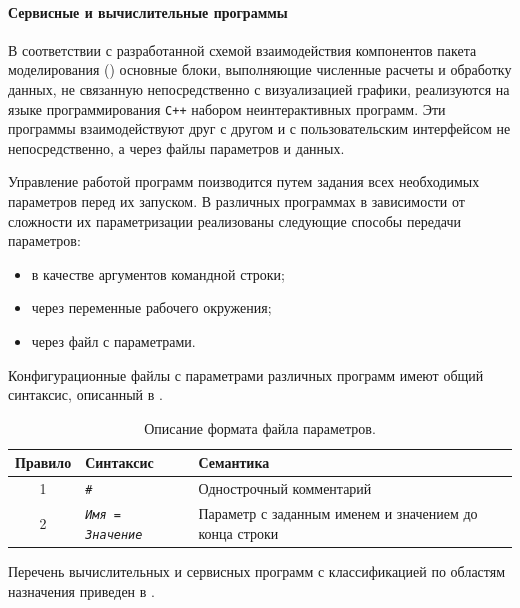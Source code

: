 \paragraph{Сервисные и вычислительные программы}

В соответствии с разработанной схемой взаимодействия компонентов
пакета моделирования () основные
блоки, выполняющие численные расчеты и обработку данных, не связанную
непосредственно с визуализацией графики, реализуются на языке
программирования {\tt C++} набором неинтерактивных программ.  Эти
программы взаимодействуют друг с другом и с пользовательским
интерфейсом не непосредственно, а через файлы параметров и данных.

Управление работой программ поизводится путем задания всех необходимых
параметров перед их запуском.  В различных программах в зависимости от
сложности их параметризации реализованы следующие способы передачи
параметров:
\begin{itemize}
\item в качестве аргументов командной строки;
\item через переменные рабочего окружения;
\item через файл с параметрами.
\end{itemize}

Конфигурационные файлы с параметрами различных программ имеют общий
синтаксис, описанный в .

\begin{table}[ht]
\centering
\caption{Описание формата файла параметров.}
\label{tabl:par_syntax}
\begin{tabular}{|c|l|p{10cm}|}
\hline
Правило & Синтаксис & Семантика \\
\hline
1 & \tt \#                 & Однострочный комментарий \\
2 & \tt \em Имя = Значение & Параметр с заданным именем и значением до конца строки \\
\hline
\end{tabular}
\end{table}

Перечень вычислительных и сервисных программ с классификацией по
областям назначения приведен в .

